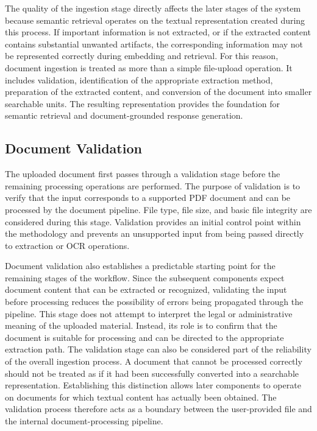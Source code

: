 \documentclass[12pt,a4paper,oneside]{report}
\begin{document}
The quality of the ingestion stage directly affects the later stages of the
system because semantic retrieval operates on the textual representation
created during this process. If important information is not extracted, or
if the extracted content contains substantial unwanted artifacts, the
corresponding information may not be represented correctly during embedding
and retrieval. For this reason, document ingestion is treated as more than a
simple file-upload operation. It includes validation, identification of the
appropriate extraction method, preparation of the extracted content, and
conversion of the document into smaller searchable units. The resulting
representation provides the foundation for semantic retrieval and
document-grounded response generation.

\subsection{Document Validation}

The uploaded document first passes through a validation stage before the
remaining processing operations are performed. The purpose of validation is
to verify that the input corresponds to a supported PDF document and can be
processed by the document pipeline. File type, file size, and basic file
integrity are considered during this stage. Validation provides an initial
control point within the methodology and prevents an unsupported input from
being passed directly to extraction or OCR operations.

Document validation also establishes a predictable starting point for the
remaining stages of the workflow. Since the subsequent components expect
document content that can be extracted or recognized, validating the input
before processing reduces the possibility of errors being propagated through
the pipeline. This stage does not attempt to interpret the legal or
administrative meaning of the uploaded material. Instead, its role is to
confirm that the document is suitable for processing and can be directed to
the appropriate extraction path. The validation stage can also be considered part of the reliability of the
overall ingestion process. A document that cannot be processed correctly
should not be treated as if it had been successfully converted into a
searchable representation. Establishing this distinction allows later
components to operate on documents for which textual content has actually
been obtained. The validation process therefore acts as a boundary between
the user-provided file and the internal document-processing pipeline.
\end{document}
